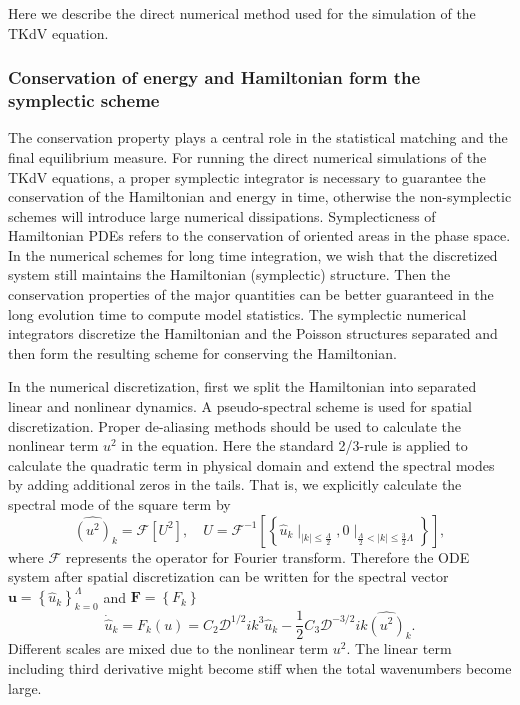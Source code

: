 \documentclass[11pt]{article}
\begin{document}
Here we describe the direct numerical method used for the simulation of the TKdV equation.


\subsubsection*{Conservation of energy and Hamiltonian form the symplectic scheme}

The conservation property plays a central role in the statistical
matching and the final equilibrium measure.  For running the direct numerical simulations of the TKdV equations,
a proper symplectic integrator is necessary to guarantee the conservation
of the Hamiltonian and energy in time, otherwise the non-symplectic
schemes will introduce large numerical dissipations. 
Symplecticness of Hamiltonian PDEs refers to the conservation of oriented areas in the phase space. In the numerical schemes for long time integration, we wish that the discretized system still maintains the Hamiltonian (symplectic) structure. Then the conservation properties of the major quantities can be better guaranteed in the long evolution time to compute model statistics. The symplectic numerical integrators discretize the Hamiltonian and the Poisson structures separated and then form the resulting scheme for conserving the Hamiltonian.

In the numerical discretization, first we split the Hamiltonian into separated linear and nonlinear dynamics. A pseudo-spectral scheme is used for spatial discretization. Proper de-aliasing methods should be used to calculate the nonlinear term $u^{2}$ in the equation. Here the standard 2/3-rule is applied to calculate the quadratic term in physical domain and extend the spectral modes by adding additional zeros in the tails. That is, we explicitly calculate the spectral mode of the square term by 
\[
\widehat{\left(u^{2}\right)}_{k}=\mathcal{F}\left[U^{2}\right],\quad U=\mathcal{F}^{-1}\left[\left\{ \hat{u}_{k}\mid_{\left|k\right|\leq\frac{\Lambda}{2}},0\mid_{\frac{\Lambda}{2}<\left|k\right|\leq\frac{3}{2}\Lambda}\right\} \right],
\]
where $\mathcal{F}$ represents the operator for Fourier transform.
Therefore the ODE system after spatial discretization can be written for the spectral vector $\mathbf{u}=\left\{ \hat{u}_{k}\right\} _{k=0}^{\Lambda}$ and $\mathbf{F}=\left\{ F_{k}\right\}$
\[
\dot{\hat{u}}_{k}=F_{k}\left(u\right)=C_{2}\mathcal{D}^{1/2}ik^{3}\hat{u}_{k}-\frac{1}{2}C_{3}\mathcal{D}^{-3/2}ik\widehat{\left(u^{2}\right)}_{k}.
\]
Different scales are mixed due to the nonlinear term $u^{2}$. The linear term including third derivative might become stiff when the total wavenumbers become large.
\end{document}

